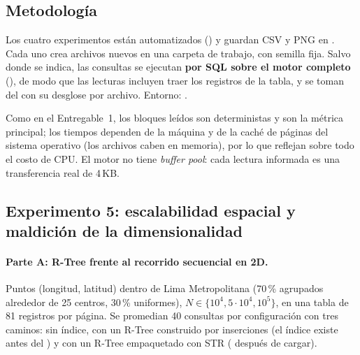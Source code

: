 
\subsection{Metodología}

Los cuatro experimentos están automatizados () y
guardan CSV y PNG en . Cada uno crea archivos nuevos en una carpeta de
trabajo, con semilla fija. Salvo donde se indica, las consultas se ejecutan \textbf{por SQL sobre el
motor completo} (), de modo que las lecturas incluyen traer los registros de
la tabla, y se toman del  con su desglose por archivo. Entorno:
.

Como en el Entregable~1, los bloques leídos son deterministas y son la métrica principal; los tiempos
dependen de la máquina y de la caché de páginas del sistema operativo (los archivos caben en memoria),
por lo que reflejan sobre todo el costo de CPU. El motor no tiene \emph{buffer pool}: cada lectura
informada es una transferencia real de 4\,KB.

\subsection{Experimento 5: escalabilidad espacial y maldición de la dimensionalidad}

\paragraph{Parte A: R-Tree frente al recorrido secuencial en 2D.} Puntos (longitud, latitud) dentro
de Lima Metropolitana (70\,\% agrupados alrededor de 25 centros, 30\,\% uniformes), $N\in\{10^4,
5\cdot10^4, 10^5\}$, en una tabla  de 81 registros por página.
Se promedian 40 consultas por configuración con tres caminos: sin índice, con un R-Tree construido
por inserciones (el índice existe antes del ) y con un R-Tree empaquetado con STR
( después de cargar).

\begin{table}[H]
\centering\scriptsize
\resizebox{\ifdim\width>\textwidth\textwidth\else\width\fi}{!}{}
\caption{Experimento 5A: bloques leídos (índice + tabla) y tiempo por consulta.}
\label{tab:exp5}
\end{table}

